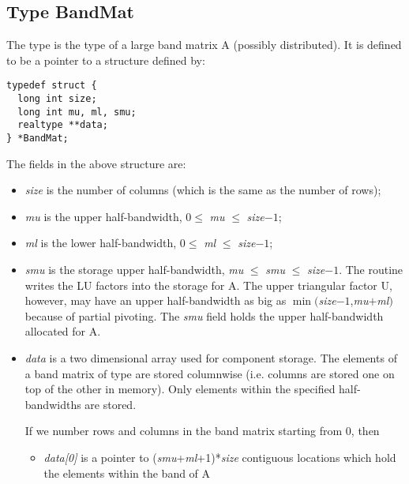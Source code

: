 %
\subsection{Type BandMat}
The type  is the type of a large band matrix A (possibly distributed). 
It is defined to be a pointer to a structure defined by:
\begin{verbatim}
typedef struct {
  long int size;
  long int mu, ml, smu;
  realtype **data;
} *BandMat;
\end{verbatim}
The fields in the above structure are:
\begin{itemize}

\item {\em size} is the number of columns (which is the same as the number of  rows);
                                                                  
\item {\em mu} is the upper half-bandwidth, $0 \le$ {\em mu} $\le$ {\em size}$-1$;

\item {\em ml} is the lower half-bandwidth, $0 \le$ {\em ml} $\le$ {\em size}$-1$;

\item {\em smu} is the storage upper half-bandwidth, 
  {\em mu} $\le$ {\em smu} $\le$ {\em size}$-1$.      
  The  routine writes the LU factors           
  into the storage for A. The upper triangular factor U, 
  however, may have an upper half-bandwidth as big as         
  $\min(${\em size}$-1$,{\em mu}$+${\em ml}$)$
  because of partial pivoting. The {\em smu} field holds the upper 
  half-bandwidth allocated for A.       
  
\item {\em data} is a two dimensional array used for component storage.    
  The elements of a band matrix of type  are      
  stored columnwise (i.e. columns are stored one on top  
  of the other in memory). Only elements within the      
  specified half-bandwidths are stored.                       
                                                                 
  If we number rows and columns in the band matrix starting      
  from $0$, then                                                   
  \begin{itemize}
  \item {\em data[0]} is a pointer to 
    ({\em smu}+{\em ml}+1)*{\em size} contiguous locations   
    which hold the elements within the band of A        
    

\end{itemize}
\end{itemize}
